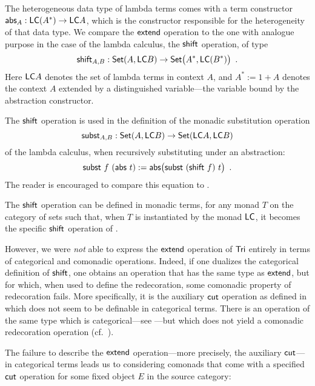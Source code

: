 \documentclass{amsart}
\begin{document}
\begin{remark}\label{rem:shift}
  The heterogeneous data type of lambda terms comes with a term constructor $\mathsf{abs}_A : \mathsf{LC} (A^*) \to \mathsf{LC} A$, which 
  is the constructor responsible for the heterogeneity of that data type.
  We compare the $\mathsf{extend}$ operation to the one with analogue purpose in the case of the lambda calculus,
  the $\mathsf{shift}$ operation, of type
  \begin{equation}  \mathsf{shift}_{A,B} : \mathsf{Set}(A,\mathsf{LC} B) \to \mathsf{Set}\bigl(A^*,\mathsf{LC}(B^*)\bigr) \enspace .\label{eq:shift}\end{equation}
  Here $\mathsf{LC} A$ denotes the set of lambda terms in context $A$, and $A^*:=1 + A$ denotes the context $A$ extended by a distinguished 
  variable---the variable bound by the abstraction constructor.
  
  The $\mathsf{shift}$ operation is used in the definition of the monadic substitution operation
  \[ \mathsf{subst}_{A,B} : \mathsf{Set}(A,\mathsf{LC} B) \to \mathsf{Set}(\mathsf{LC} A,\mathsf{LC} B) \]
  of the lambda calculus, when recursively substituting under an abstraction:
   \[ \mathsf{subst}~f~(\mathsf{abs}~t):= \mathsf{abs}\bigl(\mathsf{subst}~(\mathsf{shift}~f)~t\bigr) \enspace . \]
  The reader is encouraged to compare this equation to .
  
  The $\mathsf{shift}$ operation can be defined in monadic terms, for any monad $T$ on the category of sets such that,
  when $T$ is instantiated by the monad $\mathsf{LC}$, it becomes the specific $\mathsf{shift}$ operation of .
  
  However, we were \emph{not} able to express the $\mathsf{extend}$ operation of $\mathsf{Tri}$ entirely in terms of categorical and comonadic operations. Indeed, if
  one dualizes the categorical definition of $\mathsf{shift}$, one obtains an operation that has the same type as $\mathsf{extend}$, 
  but for which, when used to define the redecoration, some comonadic property of redecoration fails.
  More specifically, it is the auxiliary $\mathsf{cut}$ operation as defined in  which does not seem to be 
  definable in categorical terms. There is an operation of the same type which is categorical---see ---but
  which does not yield a comonadic redecoration operation (cf.\ ).
\end{remark}


The failure to describe the $\mathsf{extend}$ operation---more precisely, the auxiliary $\mathsf{cut}$---in categorical terms leads us 
to considering comonads that come with a specified $\mathsf{cut}$ operation for some fixed object $E$ in the source category:
\end{document}
